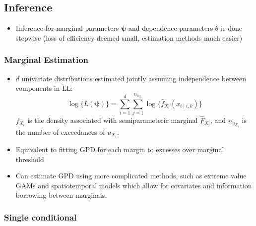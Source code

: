 \documentclass{article}
\begin{document}
\subsection{Inference}

\begin{itemize}
  \item Inference for marginal parameters $\bm{\psi}$ and dependence parameters $\theta$ is done stepwise (loss of efficiency deemed small, estimation methods much easier)
\end{itemize}

\subsubsection{Marginal Estimation}

\begin{itemize}
  \item $d$ univariate distributions estimated jointly assuming independence between components in LL:
    \[
      \log\{L(\bm{\psi})\} = \sum_{i=1}^{d}{\sum_{j=1}^{n_{u_{X_i}}}{\log\{\hat{f}_{X_i}(x_{i \mid i, k})\}}}
    \]
    $f_{X_i}$ is the density associated with semiparameteric marginal $\hat{F}_{X_i}$, and $n_{u_{X_i}}$ is the number of exceedances of $u_{X_i}$.
  \item Equivalent to fitting GPD for each margin to excesses over marginal threshold
  \item Can estimate GPD using more complicated methods, such as extreme value GAMs and spatiotemporal models which allow for covariates and information borrowing between marginals.
\end{itemize}

\subsubsection{Single conditional}
\end{document}
